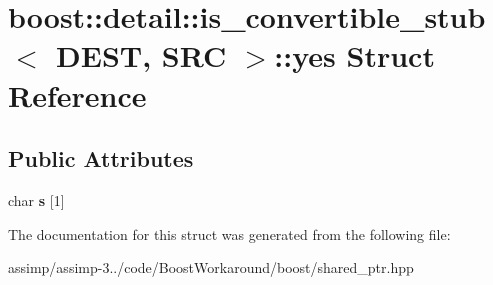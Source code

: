 \hypertarget{structboost_1_1detail_1_1is__convertible__stub_1_1yes}{\section{boost\+:\+:detail\+:\+:is\+\_\+convertible\+\_\+stub$<$ D\+E\+S\+T, S\+R\+C $>$\+:\+:yes Struct Reference}
\label{structboost_1_1detail_1_1is__convertible__stub_1_1yes}
}
\subsection*{Public Attributes}
\begin{DoxyCompactItemize}
\item 
\hypertarget{structboost_1_1detail_1_1is__convertible__stub_1_1yes_a3aeed7e2d6a3a0650e74b9493bbd60e2}{char {\bfseries s} \mbox{[}1\mbox{]}}\label{structboost_1_1detail_1_1is__convertible__stub_1_1yes_a3aeed7e2d6a3a0650e74b9493bbd60e2}

\end{DoxyCompactItemize}


The documentation for this struct was generated from the following file\+:\begin{DoxyCompactItemize}
\item 
assimp/assimp-\/3../code/\+Boost\+Workaround/boost/shared\+\_\+ptr.\+hpp\end{DoxyCompactItemize}
